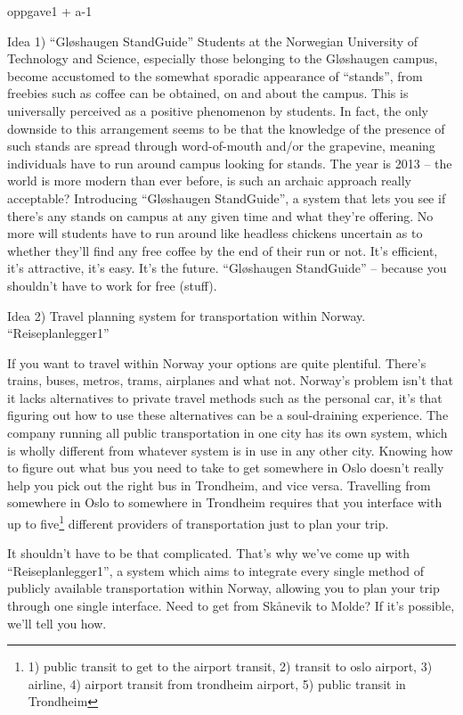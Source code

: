 oppgave1 + a-1

Idea 1)
``Gløshaugen StandGuide''
Students at the Norwegian University of Technology and Science, 
especially those belonging to the Gløshaugen campus, 
become accustomed to the somewhat sporadic appearance of ``stands'', 
from freebies such as coffee can be obtained, on and about the campus.
This is universally perceived as a positive phenomenon by students.
In fact, the only downside to this arrangement seems to be that the knowledge of the presence of such stands are spread through word-of-mouth and/or the grapevine,
meaning individuals have to run around campus looking for stands.
The year is 2013 -- the world is more modern than ever before, 
is such an archaic approach really acceptable?
Introducing ``Gløshaugen StandGuide'', a system that lets you see if there's any stands on campus at any given time and what they're offering.
No more will students have to run around like headless chickens uncertain as to whether they'll find any free coffee by the end of their run or not.
It's efficient, it's attractive, it's easy.
It's the future.
``Gløshaugen StandGuide'' -- because you shouldn't have to work for free (stuff).

Idea 2)
Travel planning system for transportation within Norway.
``Reiseplanlegger1''

If you want to travel within Norway your options are quite plentiful.
There's trains, buses, metros, trams, airplanes and what not.
Norway's problem isn't that it lacks alternatives to private travel methods such as the personal car, 
it's that figuring out how to use these alternatives can be a soul-draining experience.
The company running all public transportation in one city has its own system,
which is wholly different from whatever system is in use in any other city.
Knowing how to figure out what bus you need to take to get somewhere in Oslo doesn't really help you pick out the right bus in Trondheim, and vice versa.
Travelling from somewhere in Oslo to somewhere in Trondheim requires that you interface with up to five\footnote{1) public transit to get to the airport transit, 2) transit to oslo airport, 3) airline, 4) airport transit from trondheim airport, 5) public transit in Trondheim} different providers of transportation just to plan your trip.

It shouldn't have to be that complicated.
That's why we've come up with ``Reiseplanlegger1'',
a system which aims to integrate every single method of publicly available transportation within Norway, 
allowing you to plan your trip through one single interface. 
Need to get from Skånevik to Molde?
If it's possible, we'll tell you how.